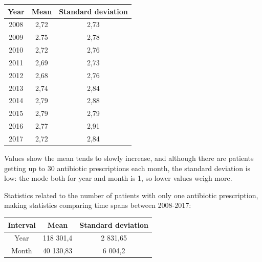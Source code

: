 \begin{center}
	\begin{tabular}{c|c|c}
		Year & Mean & Standard deviation \\
		\hline
		2008 & 2,72 & 2,73 \\
		\hline
		2009 & 2.75 & 2,78 \\
		\hline
		2010 & 2,72 &  2,76 \\
		\hline
		2011 & 2,69 &  2,73 \\
		\hline
		2012 & 2,68 & 2,76 \\
		\hline
		2013 & 2,74 & 2,84 \\
		\hline
		2014 & 2,79 & 2,88 \\
		\hline
		2015 & 2,79 & 2,79 \\
		\hline
		2016 & 2,77 & 2,91 \\
		\hline
		2017 & 2,72 & 2,84 \\
	\end{tabular}
\end{center}

Values show the mean tends to slowly increase, and although there are patients getting up to 30 antibiotic prescriptions each month, the standard deviation is low: the mode both for year and month is 1, so lower values weigh more.

Statistics related to the number of patients with only one antibiotic prescription, making statistics comparing time spans between 2008-2017:
\begin{center}
	\begin{tabular}{c|c|c}
		Interval & Mean & Standard deviation \\
		\hline
		Year & 118 301,4 & 2 831,65 \\
		\hline
		Month & 40 130,83 & 6 004,2 \\
	\end{tabular}
\end{center}

